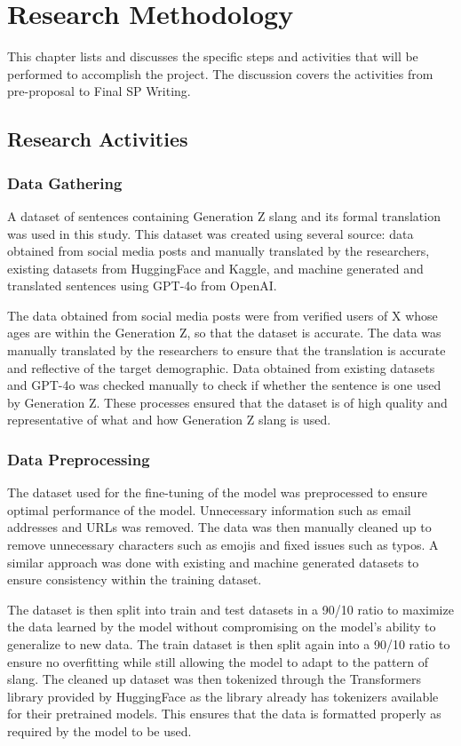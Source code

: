 \chapter{Research Methodology}
This chapter lists and discusses the specific steps and activities that will be performed to accomplish the project. 
The discussion covers the activities from pre-proposal to Final SP Writing.

\section{Research Activities}
\subsection{Data Gathering} 
A dataset of sentences containing Generation Z slang and its formal translation was used in this study. 
This dataset was created using several source: data obtained from social media posts and manually translated by the researchers, existing datasets from HuggingFace and Kaggle, and machine generated and translated sentences using GPT-4o from OpenAI.

The data obtained from social media posts were from verified users of X whose ages are within the Generation Z, so that the dataset is accurate. The data was manually translated by the researchers to ensure that the translation is accurate and reflective of the target demographic. Data obtained from existing datasets and GPT-4o was checked manually to check if whether the sentence is one used by Generation Z. These processes ensured that the dataset is of high quality and representative of what and how Generation Z slang is used.

\subsection{Data Preprocessing} 
The dataset used for the fine-tuning of the model was preprocessed to ensure optimal performance of the model.
Unnecessary information such as email addresses and URLs was removed. The data was then manually cleaned up to remove unnecessary characters such as emojis and fixed issues such as typos. A similar approach was done with existing and machine generated datasets to ensure consistency within the training dataset.

The dataset is then split into train and test datasets in a 90/10 ratio to maximize the data learned by the model without compromising on the model's ability to generalize to new data. The train dataset is then split again into a 90/10 ratio to ensure no overfitting while still allowing the model to adapt to the pattern of slang. The cleaned up dataset was then tokenized through the Transformers library provided by HuggingFace as the library already has tokenizers available for their pretrained models.
This ensures that the data is formatted properly as required by the model to be used.

